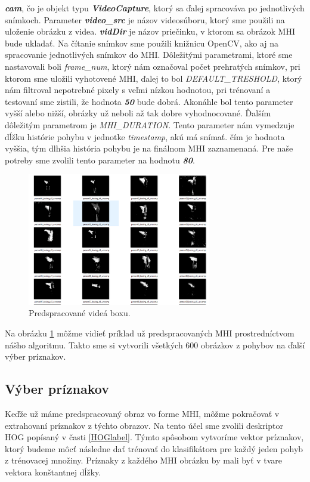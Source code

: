  \textbf{\textit{cam}}, čo je objekt typu \textbf{\textit{VideoCapture}}, ktorý sa ďalej spracováva po jednotlivých snímkoch. 
 Parameter \textbf{\textit{video\_src}} je názov videosúboru, ktorý sme použili na uloženie obrázku z videa.
 \textbf{\textit{vidDir}} je názov priečinku, v ktorom sa obrázok MHI bude ukladať. 
 Na čítanie snímkov sme použili knižnicu OpenCV, ako aj na spracovanie jednotlivých snímkov do MHI. Dôležitými parametrami, ktoré sme nastavovali boli \textit{frame\_num}, ktorý nám označoval počet prehratých snímkov, pri ktorom sme uložili vyhotovené MHI, ďalej to bol \textit{DEFAULT\_TRESHOLD}, ktorý nám filtroval nepotrebné pixely s veľmi nízkou hodnotou, pri trénovaní a testovaní sme zistili, že hodnota \textit{\textbf{50}} bude dobrá. Akonáhle bol tento parameter vyšší alebo nižší, obrázky už neboli až tak dobre vyhodnocované. Ďalším dôležitým parametrom je \textit{MHI\_DURATION}. Tento parameter nám vymedzuje dĺžku histórie pohybu v jednotke \textit{timestamp}, akú má snímať. čím je hodnota vyššia, tým dlhšia história pohybu je na finálnom MHI zaznamenaná. 
 Pre naše potreby sme zvolili tento parameter na hodnotu \textit{\textbf{80}}.

\begin{figure}[h]
  \centering
  \includegraphics[width=8cm]{img/MHIbox.png}
  \caption{Predspracované videá boxu.}
  \label{MHIbox}
\end{figure}  
Na obrázku \ref{MHIbox} môžme vidieť príklad už predspracovaných MHI prostredníctvom nášho algoritmu. Takto sme si vytvorili všetkých 600 obrázkov z pohybov na ďalší výber príznakov. 

\subsection{Výber príznakov}
Keďže už máme predspracovaný obraz vo forme MHI, môžme pokračovať v extrahovaní príznakov z týchto obrazov. Na tento účel sme zvolili deskriptor HOG popísaný v časti \ref{HOGlabel}. Týmto spôsobom vytvoríme vektor príznakov, ktorý budeme môcť následne dať trénovať do klasifikátora pre každý jeden pohyb z trénovacej množiny. Príznaky z každého MHI obrázku by mali byť v tvare vektora konštantnej dĺžky. 

